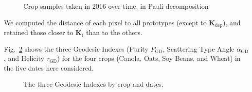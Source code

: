 \documentclass[journal]{IEEEtran}
\begin{document}
\begin{figure}[hbt]
  \centering
  \caption{Crop samples taken in 2016 over time, in Pauli decomposition}
  \label{fig:sample_images}
\end{figure}

We computed the distance of each pixel to all prototypes (except to $\bm K_{\text{dep}}$), and retained those closer to $\bm K_{\text{t}}$ than to the others.

Fig.~\ref{fig:AllIndexes} shows the three Geodesic Indexes (Purity $P_{\text{GD}}$, Scattering Type Angle $\alpha_{\text{GD}}$, and Helicity $\tau_{\text{GD}}$) for the four crops (Canola, Oats, Soy Beans, and Wheat) in the five dates here considered.

\begin{figure}[htb]
\centering
{}
\caption{The three Geodesic Indexes by crop and dates.}\label{fig:AllIndexes}
\end{figure}
\end{document}
